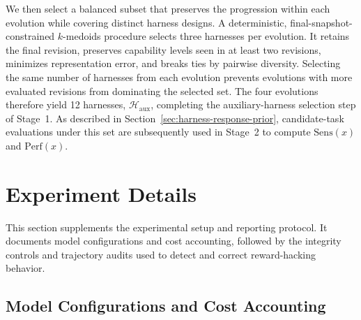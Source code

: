We then select a balanced subset that preserves the progression within each
evolution while covering distinct harness designs.  A deterministic,
final-snapshot-constrained $k$-medoids procedure selects three harnesses per
evolution.  It retains the final revision, preserves capability levels seen in
at least two revisions, minimizes representation error, and breaks ties by
pairwise diversity.  Selecting the same number of harnesses from each evolution
prevents evolutions with more evaluated revisions from dominating the selected
set.  The four evolutions therefore yield 12 harnesses,
$\mathcal{H}_{\mathrm{aux}}$, completing the auxiliary-harness selection step
of Stage~1.  As described in Section~\ref{sec:harness-response-prior},
candidate-task evaluations under this set are subsequently used in Stage~2 to
compute $\mathrm{Sens}(x)$ and $\mathrm{Perf}(x)$. 


\section{Experiment Details}
\label{app:experiment-details}
This section supplements the experimental setup and reporting protocol.  It documents model configurations and cost accounting, followed by the integrity controls and trajectory audits used to detect and correct reward-hacking behavior.


\subsection{Model Configurations and Cost Accounting}
\label{app:model-configurations}

